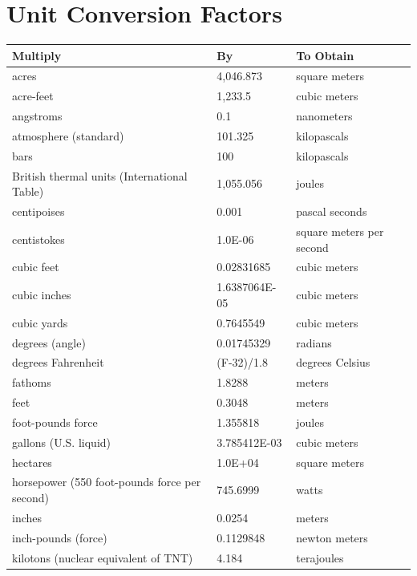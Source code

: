 \documentclass{template/openetcs_article_nocc}
\begin{document}
\section{Unit Conversion Factors}

{\footnotesize\sffamily\centering
  \begin{longtable}{||l|l|l||}
    \hline\hline
    \bfseries Multiply & \bfseries By & \bfseries To Obtain\\
    \hline\hline
    \endhead
    \hline\hline
    \endfoot
    acres & 4,046.873 & square meters\\
    \hline
    acre-feet & 1,233.5 & cubic meters\\
    \hline
    angstroms & 0.1 & nanometers\\
    \hline
    atmosphere (standard) & 101.325 & kilopascals\\
    \hline
    bars & 100 & kilopascals\\
    \hline
    British thermal units (International Table) & 1,055.056 & joules\\
    \hline
    centipoises & 0.001 & pascal seconds\\
    \hline
    centistokes & 1.0E-06 & square meters per second\\
    \hline
    cubic feet & 0.02831685 & cubic meters\\
    \hline
    cubic inches & 1.6387064E-05 & cubic meters\\
    \hline
    cubic yards & 0.7645549 & cubic meters\\
    \hline
    degrees (angle) & 0.01745329 & radians\\
    \hline
    degrees Fahrenheit & (F-32)/1.8 & degrees Celsius\\
    \hline
    fathoms & 1.8288 & meters\\
    \hline
    feet & 0.3048 & meters\\
    \hline
    foot-pounds force & 1.355818 & joules\\
    \hline
    gallons (U.S. liquid) & 3.785412E-03 & cubic meters\\
    \hline
    hectares & 1.0E+04 & square meters\\
    \hline
    horsepower (550 foot-pounds force per second) & 745.6999 & watts\\
    \hline
    inches & 0.0254 & meters\\
    \hline
    inch-pounds (force) & 0.1129848 & newton meters\\
    \hline
    kilotons (nuclear equivalent of TNT) & 4.184 & terajoules\\

\end{longtable}}
\end{document}
